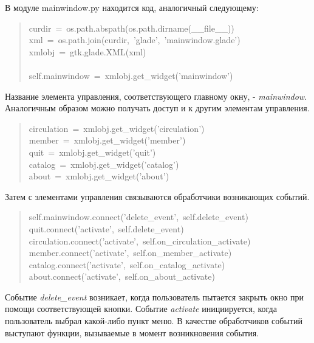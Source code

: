 \documentclass[a4paper,openany,twoside,final]{book}
\providecommand*{\DUroletitlereference}[1]{\textsl{#1}}
\begin{document}
В модуле mainwindow.py находится код, аналогичный следующему:

\begin{quote}{\ttfamily \raggedright \noindent
curdir~=~os.path.abspath(os.path.dirname(\_\_file\_\_))\\
xml~=~os.path.join(curdir,~'glade',~'mainwindow.glade')\\
xmlobj~=~gtk.glade.XML(xml)\\
~\\
self.mainwindow~=~xmlobj.get\_widget('mainwindow')
}
\end{quote}

Название элемента управления, соответствующего главному окну, -
\DUroletitlereference{mainwindow}.  Аналогичным образом можно получать доступ и к другим
элементам управления.

\begin{quote}{\ttfamily \raggedright \noindent
circulation~=~xmlobj.get\_widget('circulation')\\
member~=~xmlobj.get\_widget('member')\\
quit~=~xmlobj.get\_widget('quit')\\
catalog~=~xmlobj.get\_widget('catalog')\\
about~=~xmlobj.get\_widget('about')
}
\end{quote}

Затем с элементами управления связываются обработчики возникающих
событий.

\begin{quote}{\ttfamily \raggedright \noindent
self.mainwindow.connect('delete\_event',~self.delete\_event)\\
quit.connect('activate',~self.delete\_event)\\
circulation.connect('activate',~self.on\_circulation\_activate)\\
member.connect('activate',~self.on\_member\_activate)\\
catalog.connect('activate',~self.on\_catalog\_activate)\\
about.connect('activate',~self.on\_about\_activate)
}
\end{quote}

Событие \DUroletitlereference{delete\_event} возникает, когда пользователь пытается закрыть
окно при помощи соответствующей кнопки.  Событие \DUroletitlereference{activate}
инициируется, когда пользователь выбрал какой-либо пункт меню.  В
качестве обработчиков событий выступают функции, вызываемые в момент
возникновения события.
\end{document}
